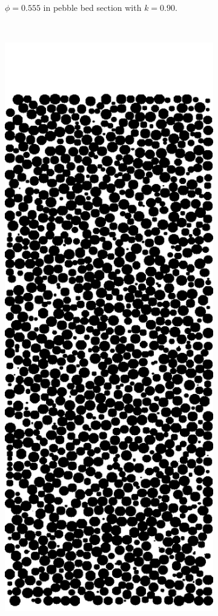 \begin{figure}[h]
\begin{subfigure}[b]{0.2\textwidth}
                \caption{$\phi = 0.555$ in pebble bed section with $k = 0.90$.}
                \label{fig:2d-res20-k090}
        \end{subfigure}
        ~
        \begin{subfigure}[b]{0.2\textwidth}
                \includegraphics[width=\textwidth]{figures/lbm/2d-res20-k100.png}

\end{subfigure}
\end{figure}

